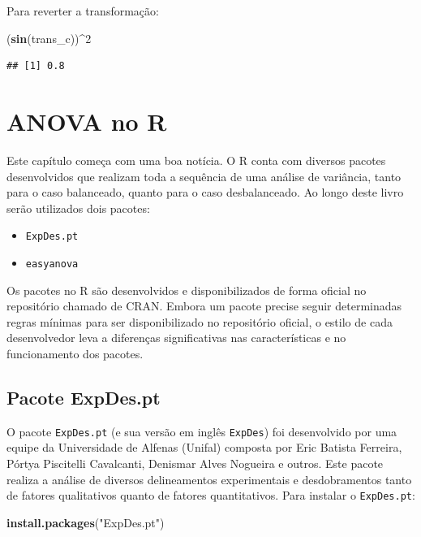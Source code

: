 \documentclass[
]{article}
\newenvironment{Shaded}{\begin{snugshade}}{\end{snugshade}}
\newcommand{\DecValTok}[1]{\textcolor[rgb]{0.00,0.00,0.81}{#1}}
\newcommand{\KeywordTok}[1]{\textcolor[rgb]{0.13,0.29,0.53}{\textbf{#1}}}
\newcommand{\NormalTok}[1]{#1}
\newcommand{\OperatorTok}[1]{\textcolor[rgb]{0.81,0.36,0.00}{\textbf{#1}}}
\newcommand{\StringTok}[1]{\textcolor[rgb]{0.31,0.60,0.02}{#1}}
\providecommand{\tightlist}{%
  \setlength{\itemsep}{0pt}\setlength{\parskip}{0pt}}
\begin{document}
Para reverter a transformação:

\begin{Shaded}
\begin{Highlighting}[]
\NormalTok{(}\KeywordTok{sin}\NormalTok{(trans_c))}\OperatorTok{^}\DecValTok{2}
\end{Highlighting}
\end{Shaded}

\begin{verbatim}
## [1] 0.8
\end{verbatim}

\hypertarget{anova-no-r}{%
\section{ANOVA no R}\label{anova-no-r}}

Este capítulo começa com uma boa notícia. O R conta com diversos pacotes desenvolvidos que realizam toda a sequência de uma análise de variância, tanto para o caso balanceado, quanto para o caso desbalanceado. Ao longo deste livro serão utilizados dois pacotes:

\begin{itemize}
\tightlist
\item
  \texttt{ExpDes.pt}
\item
  \texttt{easyanova}
\end{itemize}

Os pacotes no R são desenvolvidos e disponibilizados de forma oficial no repositório chamado de CRAN. Embora um pacote precise seguir determinadas regras mínimas para ser disponibilizado no repositório oficial, o estilo de cada desenvolvedor leva a diferenças significativas nas características e no funcionamento dos pacotes.

\hypertarget{pacote-expdes.pt}{%
\subsection{Pacote ExpDes.pt}\label{pacote-expdes.pt}}

O pacote \texttt{ExpDes.pt} (e sua versão em inglês \texttt{ExpDes}) foi desenvolvido por uma equipe da Universidade de Alfenas (Unifal) composta por Eric Batista Ferreira, Pórtya Piscitelli Cavalcanti, Denismar Alves Nogueira e outros. Este pacote realiza a análise de diversos delineamentos experimentais e desdobramentos tanto de fatores qualitativos quanto de fatores quantitativos. Para instalar o \texttt{ExpDes.pt}:

\begin{Shaded}
\begin{Highlighting}[]
\KeywordTok{install.packages}\NormalTok{(}\StringTok{"ExpDes.pt"}\NormalTok{)}
\end{Highlighting}
\end{Shaded}
\end{document}
